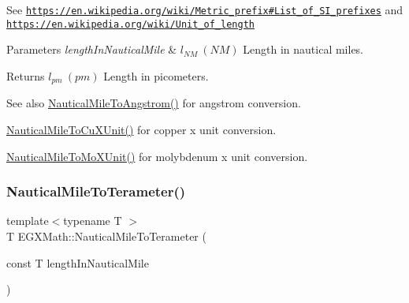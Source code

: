 See \href{https://en.wikipedia.org/wiki/Metric_prefix#List_of_SI_prefixes}{\tt https\+://en.\+wikipedia.\+org/wiki/\+Metric\+\_\+prefix\#\+List\+\_\+of\+\_\+\+S\+I\+\_\+prefixes} and \href{https://en.wikipedia.org/wiki/Unit_of_length}{\tt https\+://en.\+wikipedia.\+org/wiki/\+Unit\+\_\+of\+\_\+length} 
\begin{DoxyParams}{Parameters}
{\em length\+In\+Nautical\+Mile} & $ l_{NM}\ (NM)$ Length in nautical miles. \\
\hline
\end{DoxyParams}
\begin{DoxyReturn}{Returns}
$ l_{pm}\ (pm)$ Length in picometers. 
\end{DoxyReturn}
\begin{DoxySeeAlso}{See also}
\mbox{\hyperlink{group___e_g_x_math-_conversions-_length_conversions-_non-_s_i-_nautical_mile-_non-_s_i_ga6f451e4456d985c7d63b39a084b3dd23}{Nautical\+Mile\+To\+Angstrom()}} for angstrom conversion. 

\mbox{\hyperlink{group___e_g_x_math-_conversions-_length_conversions-_non-_s_i-_nautical_mile-_non-_s_i_gaa0638917756d520cfc0877dcde60d777}{Nautical\+Mile\+To\+Cu\+X\+Unit()}} for copper x unit conversion. 

\mbox{\hyperlink{group___e_g_x_math-_conversions-_length_conversions-_non-_s_i-_nautical_mile-_non-_s_i_ga17cfe98568d00c2e0b1c0b5d19f1b34e}{Nautical\+Mile\+To\+Mo\+X\+Unit()}} for molybdenum x unit conversion. 
\end{DoxySeeAlso}
\mbox{\label{group___e_g_x_math-_conversions-_length_conversions-_non-_s_i-_nautical_mile-_s_i_gabd27057118659d507b698fc258ee5200}} 
\subsubsection{\texorpdfstring{Nautical\+Mile\+To\+Terameter()}{NauticalMileToTerameter()}}
{\footnotesize\ttfamily template$<$typename T $>$ \\
T E\+G\+X\+Math\+::\+Nautical\+Mile\+To\+Terameter (\begin{DoxyParamCaption}\item[{const T}]{length\+In\+Nautical\+Mile }\end{DoxyParamCaption})}



